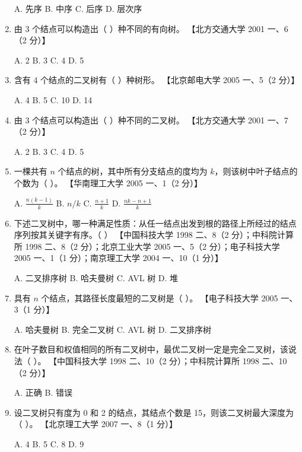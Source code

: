 \documentclass[lang=cn,newtx,10pt,scheme=chinese]{../../elegantbook}
\begin{document}
\begin{enumerate}
    A. 先序 \quad B. 中序 \quad C. 后序 \quad D. 层次序  

    \item 由 3 个结点可以构造出（ ）种不同的有向树。  
    【北方交通大学 2001 一、6（2 分）】  

    A. 2 \quad B. 3 \quad C. 4 \quad D. 5  

    \item 含有 4 个结点的二叉树有（ ）种树形。  
    【北京邮电大学 2005 一、5（2 分）】  

    A. 4 \quad B. 5 \quad C. 10 \quad D. 14  

    \item 由 3 个结点可以构造出（ ）种不同的二叉树。  
    【北方交通大学 2001 一、7（2 分）】  

    A. 2 \quad B. 3 \quad C. 4 \quad D. 5  

    \item 一棵共有 $n$ 个结点的树，其中所有分支结点的度均为 $k$，则该树中叶子结点的个数为（ ）。  
    【华南理工大学 2005 一、1（2 分）】  

    A. $\frac{n(k-1)}{k}$ \quad B. $n/k$ \quad C. $\frac{n + 1}{k}$ \quad D. $\frac{nk - n + 1}{k}$  

    \item 下述二叉树中，哪一种满足性质：从任一结点出发到根的路径上所经过的结点序列按其关键字有序。（ ）  
    【中国科技大学 1998 二、8（2 分）；中科院计算所 1998 二、8（2 分）；北京工业大学 2005 一、5（2 分）；电子科技大学 2005 一、1（1 分）；南京理工大学 2004 一、10（1 分）】  
    
    A. 二叉排序树 \quad B. 哈夫曼树 \quad C. AVL 树 \quad D. 堆  

    \item 具有 $n$ 个结点，其路径长度最短的二叉树是（ ）。  
    【电子科技大学 2005 一、3（1 分）】 

    A. 哈夫曼树 \quad B. 完全二叉树 \quad C. AVL 树 \quad D. 二叉排序树  

    \item 在叶子数目和权值相同的所有二叉树中，最优二叉树一定是完全二叉树，该说法（ ）。  
    【中国科技大学 1998 二、10（2 分）；中科院计算所 1998 二、10（2 分）】 

    A. 正确 \quad B. 错误  

    \item 设二叉树只有度为 0 和 2 的结点，其结点个数是 15，则该二叉树最大深度为（ ）。  
    【北京理工大学 2007 一、8（1 分）】  

    A. 4 \quad B. 5 \quad C. 8 \quad D. 9  


\end{enumerate}
\end{document}
